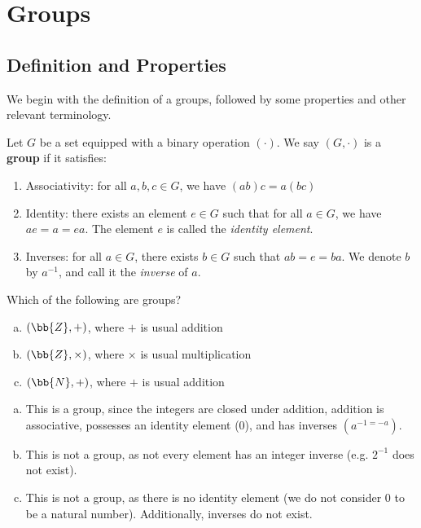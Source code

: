 \documentclass{article}
\begin{document}
\cover
\toc
\blurb

\section{Groups}
\subsection{Definition and Properties}

We begin with the definition of a groups, followed by some properties and other relevant terminology.

\begin{defn}
Let $ G $ be a set equipped with a binary operation $ (\cdot) $. We say $ (G, \cdot) $ is a \textbf{group} if it satisfies:
\begin{enumerate}
\item Associativity: for all $ a, b, c \in G $, we have $ (ab)c = a(bc) $
\item Identity: there exists an element $ e \in G $ such that for all $ a \in G $, we have $ ae = a = ea $. The element $ e $ is called the \textit{identity element}.
\item Inverses: for all $ a \in G $, there exists $ b \in G $ such that $ ab = e = ba $. We denote $ b $ by $ a^{-1} $, and call it the \textit{inverse} of $ a $.
\end{enumerate}
\end{defn}

\begin{prb}
Which of the following are groups?
\begin{enumerate}[(a)]
    \item $ (\bb{Z}, +) $, where $ + $ is usual addition
    \item $ (\bb{Z}, \times) $, where $ \times $ is usual multiplication
    \item $ (\bb{N}, +) $, where $ + $ is usual addition
\end{enumerate}
\end{prb}

\begin{soln}
\begin{enumerate}[(a)]
    \item This is a group, since the integers are closed under addition, addition is associative, possesses an identity element (0), and has inverses $ (a^{-1 = -a}) $.
    \item This is not a group, as not every element has an integer inverse (e.g. $ 2^{-1} $ does not exist).
    \item This is not a group, as there is no identity element (we do not consider 0 to be a natural number). Additionally, inverses do not exist.
\end{enumerate}
\end{soln}
\end{document}
